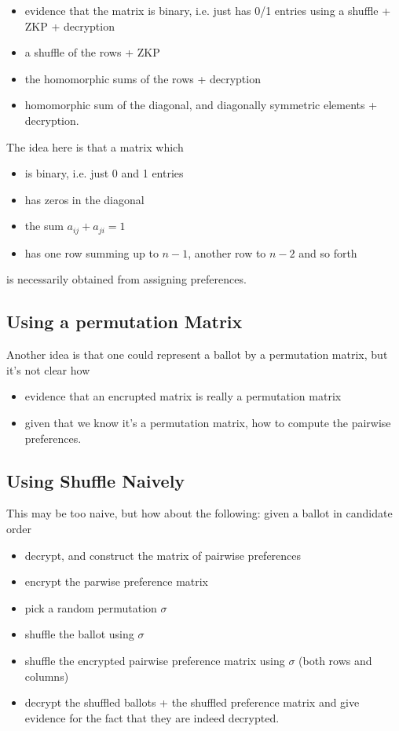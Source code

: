 \documentclass{llncs}
\begin{document}
\begin{itemize}
\item  evidence that the matrix is binary, i.e. just has 0/1 entries
 using a shuffle + ZKP + decryption
\item  a shuffle of the rows + ZKP
\item  the homomorphic sums of the rows + decryption
\item  homomorphic sum of the diagonal, and diagonally symmetric elements
 + decryption.
\end{itemize}

The idea here is that a matrix which 
\begin{itemize}
\item is binary, i.e. just 0 and 1 entries
\item has zeros in the diagonal
\item the sum $a_{ij} + a_{ji} = 1$
\item has one row summing up to $n-1$, another row to $n-2$ and so
forth
\end{itemize}
is necessarily obtained from assigning preferences.

\subsection{Using a permutation Matrix}

Another idea is that one could represent a ballot by a permutation
matrix, but it's not clear how
\begin{itemize}
\item evidence that an encrupted matrix is really a permutation
matrix
\item given that we know it's a permutation matrix, how to compute
the pairwise preferences.
\end{itemize}

\subsection{Using Shuffle Naively}

This may be too naive, but how about the following: given a ballot
in candidate order
\begin{itemize}
\item decrypt, and construct the matrix of pairwise preferences
\item encrypt the parwise preference matrix
\item pick a random permutation $\sigma$ 
\item shuffle the ballot using $\sigma$
\item shuffle the encrypted pairwise preference matrix using
$\sigma$ (both rows and columns)
\item decrypt the shuffled ballots + the shuffled preference matrix
and give evidence for the fact that they are indeed decrypted.
\end{itemize}
\end{document}
